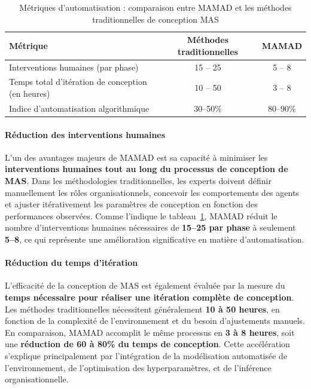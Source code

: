 \begin{table}[h!]
    \centering
    \caption{Métriques d'automatisation : comparaison entre MAMAD et les méthodes traditionnelles de conception MAS}
    \begin{tabular}{lcc}
        \hline
        \textbf{Métrique}                                   & \textbf{Méthodes traditionnelles} & \textbf{MAMAD} \\
        \hline
        Interventions humaines (par phase)                 & 15 -- 25                          & 5 -- 8         \\
        \hline
        Temps total d'itération de conception (en heures)  & 10 -- 50                          & 3 -- 8         \\
        \hline
        Indice d'automatisation algorithmique              & 30--50\%                          & 80--90\%       \\
        \hline
    \end{tabular}
    \label{tab:automation_fr}
\end{table}

\paragraph{Réduction des interventions humaines}

L'un des avantages majeurs de MAMAD est sa capacité à minimiser les \textbf{interventions humaines tout au long du processus de conception de MAS}. Dans les méthodologies traditionnelles, les experts doivent définir manuellement les rôles organisationnels, concevoir les comportements des agents et ajuster itérativement les paramètres de conception en fonction des performances observées. Comme l'indique le tableau~\ref{tab:automation_fr}, MAMAD réduit le nombre d'interventions humaines nécessaires de \textbf{15--25 par phase} à seulement \textbf{5--8}, ce qui représente une amélioration significative en matière d'automatisation.

\paragraph{Réduction du temps d'itération}

L'efficacité de la conception de MAS est également évaluée par la mesure du \textbf{temps nécessaire pour réaliser une itération complète de conception}. Les méthodes traditionnelles nécessitent généralement \textbf{10 à 50 heures}, en fonction de la complexité de l'environnement et du besoin d'ajustements manuels. En comparaison, MAMAD accomplit le même processus en \textbf{3 à 8 heures}, soit une \textbf{réduction de 60 à 80\% du temps de conception}. Cette accélération s'explique principalement par l'intégration de la modélisation automatisée de l'environnement, de l'optimisation des hyperparamètres, et de l'inférence organisationnelle.

